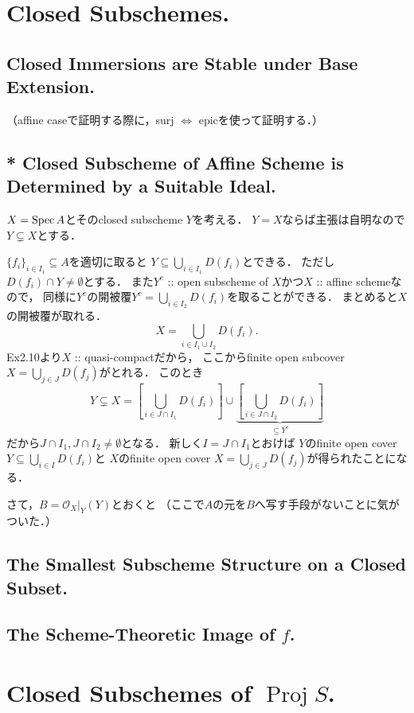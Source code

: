 \documentclass[a4paper]{jsarticle}
\newcommand{\shO}{\mathcal{O}}
\newcommand{\Proj}{\operatorname{Proj}}
\begin{document}
\section{Closed Subschemes.} %
\subsection{Closed Immersions are Stable under Base Extension.}
    （affine caseで証明する際に，surj $\iff$ epicを使って証明する．）

\subsection{* Closed Subscheme of Affine Scheme is Determined by a Suitable Ideal.}
    $X=\operatorname{Spec} A$とそのclosed subscheme $Y$を考える．
    $Y=X$ならば主張は自明なので$Y \subsetneq X$とする．

    $\{f_i\}_{i \in I_1} \subseteq A$を適切に取ると
    $Y \subseteq \bigcup_{i \in I_1} D(f_i)$とできる．
    ただし$D(f_i) \cap Y \neq \emptyset$とする．
    また$Y^c$ :: open subscheme of $X$かつ$X$ :: affine schemeなので，
    同様に$Y^c$の開被覆$Y^c=\bigcup_{i \in I_2} D(f_i)$を取ることができる．
    まとめると$X$の開被覆が取れる．
    \[ X=\bigcup_{i \in I_1 \cup I_2} D(f_i). \]
    Ex2.10より$X$ :: quasi-compactだから，
    ここからfinite open subcover$X=\bigcup_{j \in J} D(f_j)$がとれる．
    このとき
    \[
        Y \subsetneq X=
        \left[\bigcup_{i \in J \cap I_1} D(f_i)\right]
        \cup
        \underbrace{\left[\bigcup_{i \in J \cap I_2} D(f_i)\right]}_{\subseteq Y^c}
    \]
    だから$J \cap I_1, J \cap I_2 \neq \emptyset$となる．
    新しく$I=J \cap I_1$とおけば
    $Y$のfinite open cover $Y \subseteq \bigcup_{i \in I} D(f_i)$と
    $X$のfinite open cover $X=\bigcup_{j \in J} D(f_j)$が得られたことになる．

    さて，$B=\shO_X|_Y(Y)$とおくと
    （ここで$A$の元を$B$へ写す手段がないことに気がついた．）

\subsection{The Smallest Subscheme Structure on a Closed Subset.}

\subsection{The Scheme-Theoretic Image of $f$.}

\section{Closed Subschemes of $\Proj S$.} %
\end{document}
